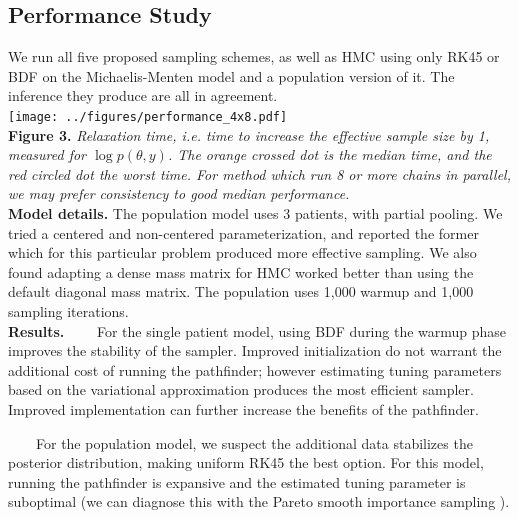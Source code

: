 \documentclass[21pt, custom, portrait, plainboxedsections]{sciposter}
\newcommand{\tabitem}{~~\llap{\textbullet}~~}
\begin{document}
\begin{multicols}{3}
\columnbreak

\section*{Performance Study}

We run all five proposed sampling schemes, as well as HMC using only RK45 or BDF on the Michaelis-Menten model and a population version of it.
The inference they produce are all in agreement. \\

\texttt{[image: ../figures/performance\_4x8.pdf]} \\
\textbf{Figure 3.} \textit{Relaxation time, i.e. time to increase the effective sample size by 1, measured for $\log p(\theta, y)$. The orange crossed dot is the median time, and the red circled dot the worst time.
For method which run 8 or more chains in parallel,  we may prefer consistency to good median performance.} \\

\textbf{Model details.} The population model uses 3 patients, with partial pooling. 
We tried a centered and non-centered parameterization, and reported the former which for this particular problem produced more effective sampling.
We also found adapting a dense mass matrix for HMC worked better than using the default diagonal mass matrix.
The population uses 1,000 warmup and 1,000 sampling iterations. \\

\textbf{Results.}
\tabitem For the single patient model, using BDF during the warmup phase improves the stability of the sampler.
Improved initialization do not warrant the additional cost of running the pathfinder;
however estimating tuning parameters based on the variational approximation produces the most efficient sampler.
Improved implementation can further increase the benefits of the pathfinder.

\tabitem For the population model, we suspect the additional data stabilizes the posterior distribution, making uniform RK45 the best option.
For this model, running the pathfinder is expansive and the estimated tuning parameter is suboptimal
(we can diagnose this with the Pareto smooth importance sampling \cite{Zhang:2021}).


{\footnotesize


}

\end{multicols}
\end{document}

